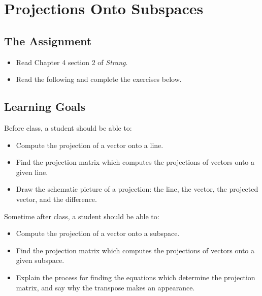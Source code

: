 \documentclass[10pt,]{book}
\theoremstyle{plain}
\theoremstyle{definition}
\numberwithin{equation}{section}
\begin{document}
\section[Projections Onto Subspaces]{Projections Onto Subspaces}\label{section-projections}
\typeout{************************************************}
\typeout{************************************************}
\subsection[The Assignment]{The Assignment}\label{subsection-97}
\begin{itemize}
\item{}Read Chapter 4 section 2 of \emph{Strang}.\item{}Read the following and complete the exercises below.\end{itemize}
\typeout{************************************************}
\typeout{************************************************}
\subsection[Learning Goals]{Learning Goals}\label{subsection-98}
Before class, a student should be able to:%
\begin{itemize}
\item{}Compute the projection of a vector onto a line.\item{}Find the projection matrix which computes the projections of vectors onto a given line.\item{}Draw the schematic picture of a projection: the line, the vector, the projected vector, and the difference.\end{itemize}
\par
Sometime after class, a student should be able to:%
\begin{itemize}
\item{}Compute the projection of a vector onto a subspace.\item{}Find the projection matrix which computes the projections of vectors onto a given subspace.\item{}
            Explain the process for finding the equations which determine the projection matrix, and say
            why the transpose makes an appearance.
        \end{itemize}
\typeout{************************************************}
\typeout{************************************************}
\end{document}
